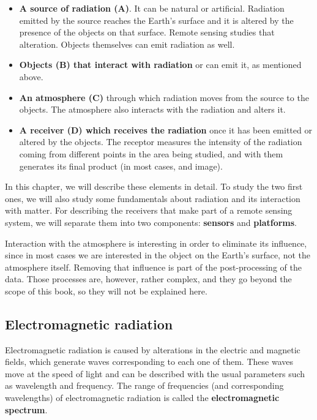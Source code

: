 \begin{itemize}
	\item \textbf{A source of radiation (A)}. It can be natural or artificial. Radiation emitted by the source reaches the Earth's surface and it is altered by the presence of the objects on that surface. Remote sensing studies that alteration. Objects themselves can emit radiation as well.
	\item \textbf{Objects (B) that interact with radiation} or can emit it, as mentioned above.
	\item \textbf{An atmosphere (C)} through which radiation moves from the source to the objects. The atmosphere also interacts with the radiation and alters it.
	\item \textbf{A receiver (D) which receives the radiation} once it has been emitted or altered by the objects. The receptor measures the intensity of the radiation coming from different points in the area being studied, and with them generates its final product (in most cases, and image). 
\end{itemize}

In this chapter, we will describe these elements in detail. To study the two first ones, we will also study some fundamentals about radiation and its interaction with matter. For describing the receivers that make part of a remote sensing system, we will separate them into two components: \textbf{sensors} and \textbf{platforms}.

Interaction with the atmosphere is interesting in order to eliminate its influence, since in most cases we are interested in the object on the Earth's surface, not the atmosphere itself. Removing that influence is part of the post-processing of the data. Those processes are, however, rather complex, and they go beyond the scope of this book, so they will not be explained here.


\subsection{Electromagnetic radiation}

Electromagnetic radiation is caused by alterations in the electric and magnetic fields, which generate waves corresponding to each one of them. These waves move at the speed of light and can be described with the usual parameters such as wavelength and frequency. The range of frequencies (and corresponding wavelengths) of electromagnetic radiation is called the \textbf{electromagnetic spectrum}.

